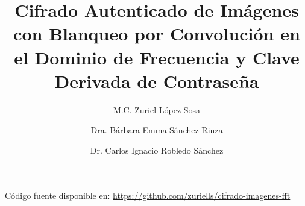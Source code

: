 \documentclass{llncs}
\begin{document}
\title{Cifrado Autenticado de Im\'agenes con Blanqueo por Convoluci\'on en el Dominio de Frecuencia y Clave Derivada de Contrase\~na}

\author{M.C. Zuriel L\'opez Sosa \and Dra. B\'arbara Emma S\'anchez Rinza \and
Dr. Carlos Ignacio Robledo S\'anchez}

\maketitle

\begin{center}
C\'odigo fuente disponible en: \url{https://github.com/zuriells/cifrado-imagenes-fft}
\end{center}
\end{document}
